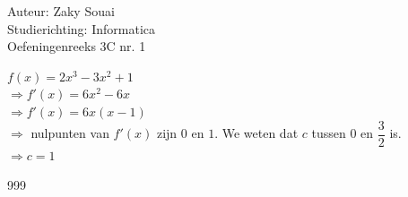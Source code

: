 \documentclass[a4paper]{article}
\begin{document}
  
\noindent \large Auteur: Zaky Souai \\
\noindent \large Studierichting:  Informatica\\
\noindent \large Oefeningenreeks 3C nr. 1\\

\bigskip

\normalsize

$f(x) = 2x^3-3x^2+1$ \\

$\Rightarrow f'(x) = 6x^2-6x $ \\

$\Rightarrow f'(x) = 6x(x-1)$ \\

$\Rightarrow$ nulpunten van $f'(x)$ zijn $0$ en $1$. We weten dat $c$ tussen $0$ en $\dfrac{3}{2}$ is. \\

$\Rightarrow c = 1$




\begin{thebibliography}{999}
\end{thebibliography}
\end{document}
